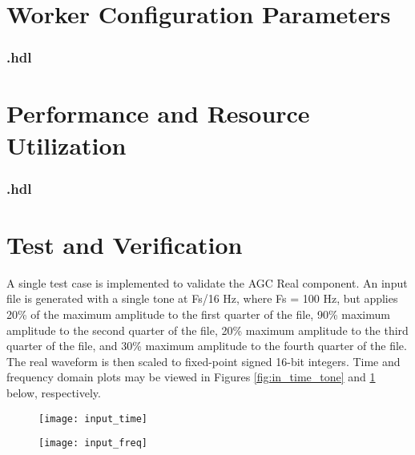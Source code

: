 \begin{landscape}
\section*{Worker Configuration Parameters}
\subsubsection*{\comp.hdl}
%
\section*{Performance and Resource Utilization}
\subsubsection*{\comp.hdl}
%
\end{landscape}
\section*{Test and Verification}

\begin{flushleft}
	A single test case is implemented to validate the AGC Real component. An input file is generated with a single tone at Fs/16 Hz, where Fs = 100 Hz, but applies 20\% of the maximum amplitude to the first quarter of the file, 90\% maximum amplitude to the second quarter of the file, 20\% maximum amplitude to the third quarter of the file, and 30\% maximum amplitude to the fourth quarter of the file. The real waveform is then scaled to fixed-point signed 16-bit integers. Time and frequency domain plots may be viewed in Figures \ref{fig:in_time_tone} and \ref{fig:in_freq_tone} below, respectively.
\end{flushleft}

	\begin{figure}[ht]
		\centering
		\begin{minipage}{.5\textwidth}
			\centering\texttt{[image: input\_time]}
			\label{fig:in_time_tone}
		\end{minipage}%
		\begin{minipage}{.5\textwidth}
			\centering\texttt{[image: input\_freq]}
			\label{fig:in_freq_tone}
		\end{minipage}
	\end{figure}

